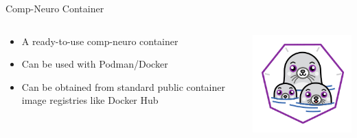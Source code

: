 \begin{frame}[c]{Comp-Neuro Container}
	\begin{columns}
		\begin{column}{0.6\textwidth}
			\begin{itemize}
				\item A ready-to-use comp-neuro container
				\item Can be used with Podman/Docker
				\item Can be obtained from standard public container image registries like Docker Hub
			\end{itemize}
		\end{column}
		\begin{column}{0.4\textwidth}	
			\includegraphics[keepaspectratio,width=\textwidth]{images/podman-logo.png}
		\end{column}
	\end{columns}
\end{frame}

